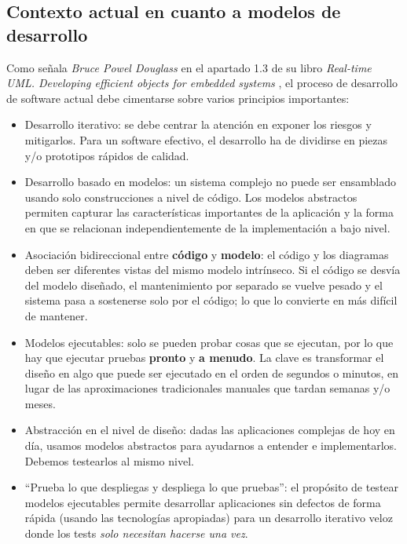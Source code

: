 \subsection{Contexto actual en cuanto a modelos de desarrollo}

Como señala \textit{Bruce Powel Douglass} en el apartado 1.3 de su libro \textit{Real-time UML. Developing efficient objects for embedded systems} \cite{real-time-uml-model-based-development}, el proceso de desarrollo de software actual debe cimentarse sobre varios principios importantes:

\begin{itemize}
	\item Desarrollo iterativo: se debe centrar la atención en exponer los riesgos y mitigarlos. Para un software efectivo, el desarrollo ha de dividirse en piezas y/o prototipos rápidos de calidad.
	\item Desarrollo basado en modelos: un sistema complejo no puede ser ensamblado usando solo construcciones a nivel de código. Los modelos abstractos permiten capturar las características importantes de la aplicación y la forma en que se relacionan independientemente de la implementación a bajo nivel.
	\item Asociación bidireccional entre \textbf{código} y \textbf{modelo}: el código y los diagramas deben ser diferentes vistas del mismo modelo intrínseco. Si el código se desvía del modelo diseñado, el mantenimiento por separado se vuelve pesado y el sistema pasa a sostenerse solo por el código; lo que lo convierte en más difícil de mantener.
	\item Modelos ejecutables: solo se pueden probar cosas que se ejecutan, por lo que hay que ejecutar pruebas \textbf{pronto} y \textbf{a menudo}. La clave es transformar el diseño en algo que puede ser ejecutado en el orden de segundos o minutos, en lugar de las aproximaciones tradicionales manuales que tardan semanas y/o meses.
	\item Abstracción en el nivel de diseño: dadas las aplicaciones complejas de hoy en día, usamos modelos abstractos para ayudarnos a entender e implementarlos. Debemos testearlos al mismo nivel.
	\item ``Prueba lo que despliegas y despliega lo que pruebas'': el propósito de testear modelos ejecutables permite desarrollar aplicaciones sin defectos de forma rápida (usando las tecnologías apropiadas) para un desarrollo iterativo veloz donde los tests \textit{solo necesitan hacerse una vez}.
\end{itemize}

